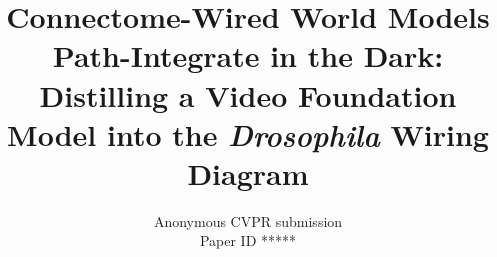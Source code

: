 \documentclass[10pt,twocolumn,letterpaper]{article}
\title{Connectome-Wired World Models Path-Integrate in the Dark:\\
Distilling a Video Foundation Model into the \emph{Drosophila} Wiring Diagram}
\author{Anonymous CVPR submission\\
Paper ID *****
}
\begin{document}
\maketitle






{
    \small
    
    
}

\clearpage
\appendix

\end{document}
